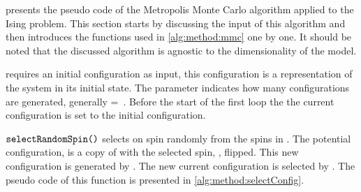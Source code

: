  presents the pseudo code of the Metropolis Monte Carlo algorithm applied to the Ising problem. This section starts by discussing the input of this algorithm and then introduces the functions used in \cref{alg:method:mmc} one by one. It should be noted that the discussed algorithm is agnostic to the dimensionality of the model. 



 requires an initial configuration  as input, this configuration is a representation of the system in its initial state. The parameter \numberOfIterations indicates how many configurations are generated, generally \mbox{\numberOfIterations = \numberOfSpins}. Before the start of the first loop the the current configuration is set to the initial configuration.

$\FuncSty{selectRandomSpin()}$ selects on spin randomly from the spins in . The potential configuration,  is a copy of  with the selected spin, \spin{}, flipped. This new configuration is generated by . The new current configuration is selected by . The pseudo code of this function is presented in \cref{alg:method:selectConfig}.



